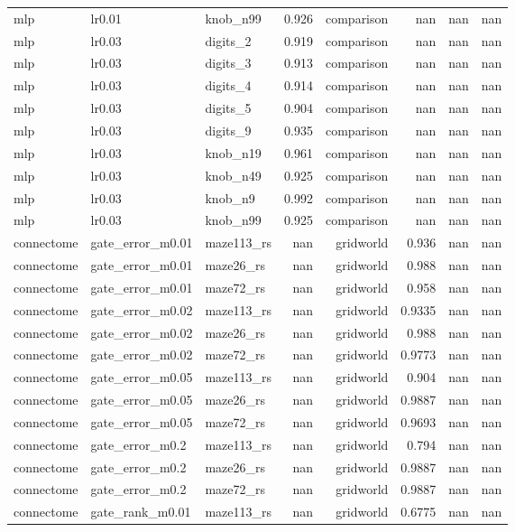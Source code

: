 \begin{table}[t]
\begin{tabular}{lllrrrrr}
mlp & lr0.01 & knob\_n99 & 0.926 & comparison & nan & nan & nan \\
mlp & lr0.03 & digits\_2 & 0.919 & comparison & nan & nan & nan \\
mlp & lr0.03 & digits\_3 & 0.913 & comparison & nan & nan & nan \\
mlp & lr0.03 & digits\_4 & 0.914 & comparison & nan & nan & nan \\
mlp & lr0.03 & digits\_5 & 0.904 & comparison & nan & nan & nan \\
mlp & lr0.03 & digits\_9 & 0.935 & comparison & nan & nan & nan \\
mlp & lr0.03 & knob\_n19 & 0.961 & comparison & nan & nan & nan \\
mlp & lr0.03 & knob\_n49 & 0.925 & comparison & nan & nan & nan \\
mlp & lr0.03 & knob\_n9 & 0.992 & comparison & nan & nan & nan \\
mlp & lr0.03 & knob\_n99 & 0.925 & comparison & nan & nan & nan \\
connectome & gate\_error\_m0.01 & maze113\_rs & nan & gridworld & 0.936 & nan & nan \\
connectome & gate\_error\_m0.01 & maze26\_rs & nan & gridworld & 0.988 & nan & nan \\
connectome & gate\_error\_m0.01 & maze72\_rs & nan & gridworld & 0.958 & nan & nan \\
connectome & gate\_error\_m0.02 & maze113\_rs & nan & gridworld & 0.9335 & nan & nan \\
connectome & gate\_error\_m0.02 & maze26\_rs & nan & gridworld & 0.988 & nan & nan \\
connectome & gate\_error\_m0.02 & maze72\_rs & nan & gridworld & 0.9773 & nan & nan \\
connectome & gate\_error\_m0.05 & maze113\_rs & nan & gridworld & 0.904 & nan & nan \\
connectome & gate\_error\_m0.05 & maze26\_rs & nan & gridworld & 0.9887 & nan & nan \\
connectome & gate\_error\_m0.05 & maze72\_rs & nan & gridworld & 0.9693 & nan & nan \\
connectome & gate\_error\_m0.2 & maze113\_rs & nan & gridworld & 0.794 & nan & nan \\
connectome & gate\_error\_m0.2 & maze26\_rs & nan & gridworld & 0.9887 & nan & nan \\
connectome & gate\_error\_m0.2 & maze72\_rs & nan & gridworld & 0.9887 & nan & nan \\
connectome & gate\_rank\_m0.01 & maze113\_rs & nan & gridworld & 0.6775 & nan & nan \\

\end{tabular}
\end{table}
